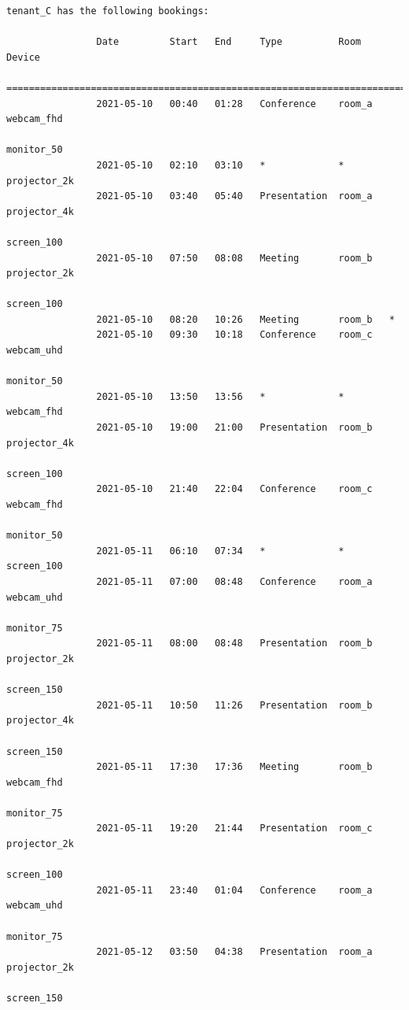 \documentclass{article}
\begin{document}
\begin{Verbatim}[gobble=8]
                tenant_C has the following bookings:
                
                Date         Start   End     Type          Room     Device
                ===========================================================================
                2021-05-10   00:40   01:28   Conference    room_a   webcam_fhd
                                                                    monitor_50
                2021-05-10   02:10   03:10   *             *        projector_2k
                2021-05-10   03:40   05:40   Presentation  room_a   projector_4k
                                                                    screen_100
                2021-05-10   07:50   08:08   Meeting       room_b   projector_2k
                                                                    screen_100
                2021-05-10   08:20   10:26   Meeting       room_b   *
                2021-05-10   09:30   10:18   Conference    room_c   webcam_uhd
                                                                    monitor_50
                2021-05-10   13:50   13:56   *             *        webcam_fhd
                2021-05-10   19:00   21:00   Presentation  room_b   projector_4k
                                                                    screen_100
                2021-05-10   21:40   22:04   Conference    room_c   webcam_fhd
                                                                    monitor_50
                2021-05-11   06:10   07:34   *             *        screen_100
                2021-05-11   07:00   08:48   Conference    room_a   webcam_uhd
                                                                    monitor_75
                2021-05-11   08:00   08:48   Presentation  room_b   projector_2k
                                                                    screen_150
                2021-05-11   10:50   11:26   Presentation  room_b   projector_4k
                                                                    screen_150
                2021-05-11   17:30   17:36   Meeting       room_b   webcam_fhd
                                                                    monitor_75
                2021-05-11   19:20   21:44   Presentation  room_c   projector_2k
                                                                    screen_100
                2021-05-11   23:40   01:04   Conference    room_a   webcam_uhd
                                                                    monitor_75
                2021-05-12   03:50   04:38   Presentation  room_a   projector_2k
                                                                    screen_150

\end{Verbatim}
\end{document}
